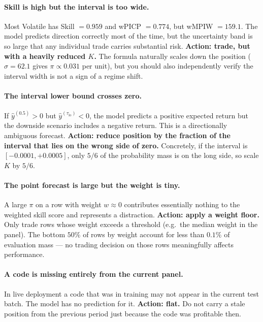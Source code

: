 \paragraph{Skill is high but the interval is too wide.}
Most Volatile has Skill $= 0.959$ and wPICP $= 0.774$, but wMPIW $= 159.1$. The model predicts direction correctly most of the time, but the uncertainty band is so large that any individual trade carries substantial risk. \textbf{Action: trade, but with a heavily reduced $K$.} The formula naturally scales down the position ($\sigma = 62.1$ gives $\pi \propto 0.031$ per unit), but you should also independently verify the interval width is not a sign of a regime shift.

\paragraph{The interval lower bound crosses zero.}
If $\hat{y}^{(0.5)} > 0$ but $\hat{y}^{(\tau_{\text{lo}})} < 0$, the model predicts a positive expected return but the downside scenario includes a negative return. This is a directionally ambiguous forecast. \textbf{Action: reduce position by the fraction of the interval that lies on the wrong side of zero.} Concretely, if the interval is $[-0.0001, +0.0005]$, only $5/6$ of the probability mass is on the long side, so scale $K$ by $5/6$.

\paragraph{The point forecast is large but the weight is tiny.}
A large $\pi$ on a row with weight $w \approx 0$ contributes essentially nothing to the weighted skill score and represents a distraction. \textbf{Action: apply a weight floor.} Only trade rows whose weight exceeds a threshold (e.g.\ the median weight in the panel). The bottom $50\%$ of rows by weight account for less than $0.1\%$ of evaluation mass --- no trading decision on those rows meaningfully affects performance.

\paragraph{A code is missing entirely from the current panel.}
In live deployment a code that was in training may not appear in the current test batch. The model has no prediction for it. \textbf{Action: flat.} Do not carry a stale position from the previous period just because the code was profitable then.


